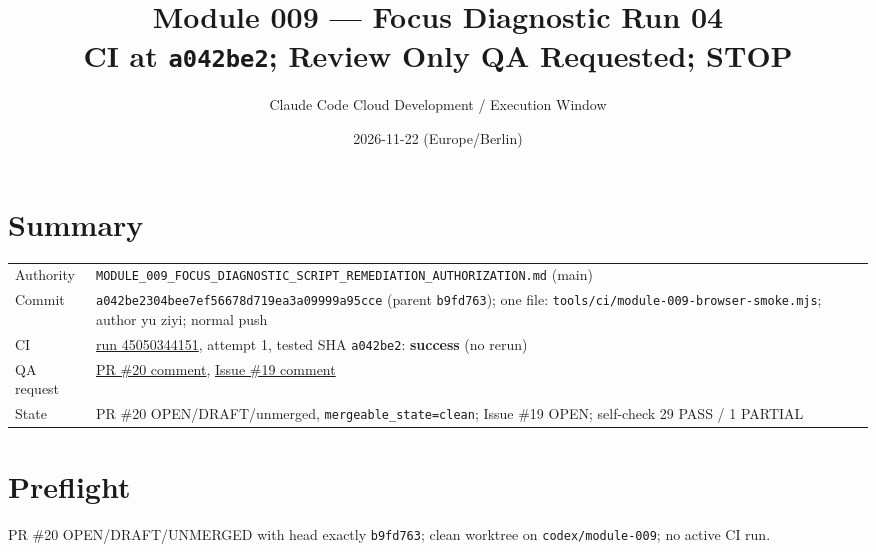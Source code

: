 \documentclass[11pt,a4paper]{article}
\title{Module 009 --- Focus Diagnostic Run 04\\CI \PASS{} at \texttt{a042be2}; Review Only QA Requested; STOP}
\author{Claude Code Cloud Development / Execution Window}
\date{2026-11-22 (Europe/Berlin)}
\newcommand{\sha}[1]{\texttt{\small #1}}
\begin{document}
\maketitle
\section*{Summary}
\begin{tabularx}{\textwidth}{@{}lX@{}}
\toprule
Authority & \texttt{MODULE\_009\_FOCUS\_DIAGNOSTIC\_SCRIPT\_REMEDIATION\_AUTHORIZATION.md} (main) \\
Commit & \sha{a042be2304bee7ef56678d719ea3a09999a95cce} (parent \sha{b9fd763}); one file: \texttt{tools/ci/module-009-browser-smoke.mjs}; author yu ziyi; normal push \\
CI & \href{https://github.com/zyyu1/personal-workspace/actions/runs/45050344151}{run 45050344151}, attempt 1, tested SHA \sha{a042be2}: \textbf{success} (no rerun) \\
QA request & \href{https://github.com/zyyu1/personal-workspace/pull/20\#issuecomment-7082997195}{PR \#20 comment}, \href{https://github.com/zyyu1/personal-workspace/issues/19\#issuecomment-7082999148}{Issue \#19 comment} \\
State & PR \#20 OPEN/DRAFT/unmerged, \texttt{mergeable\_state=clean}; Issue \#19 OPEN; self-check 29 PASS / 1 PARTIAL \\
\bottomrule
\end{tabularx}

\section{Preflight}
PR \#20 OPEN/DRAFT/UNMERGED with head exactly \sha{b9fd763}; clean worktree on \texttt{codex/module-009}; no active CI run.
\end{document}
